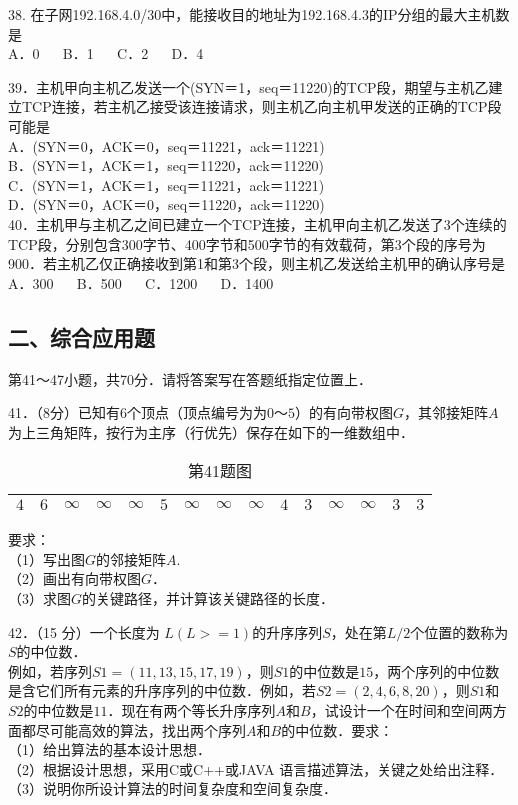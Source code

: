 38. 在子网192.168.4.0/30中，能接收目的地址为192.168.4.3的IP分组的最大主机数是 \\
A．0 $\quad$ B．1 $\quad$ C．2 $\quad$ D．4

39．主机甲向主机乙发送一个(SYN＝1，seq＝11220)的TCP段，期望与主机乙建立TCP连接，若主机乙接受该连接请求，则主机乙向主机甲发送的正确的TCP段可能是 \\
A．(SYN＝0，ACK＝0，seq＝11221，ack＝11221) \\
B．(SYN＝1，ACK＝1，seq＝11220，ack＝11220) \\
C．(SYN＝1，ACK＝1，seq＝11221，ack＝11221) \\
D．(SYN＝0，ACK＝0，seq＝11220，ack＝11220) \\

40．主机甲与主机乙之间已建立一个TCP连接，主机甲向主机乙发送了3个连续的TCP段，分别包含300字节、400字节和500字节的有效载荷，第3个段的序号为900．若主机乙仅正确接收到第1和第3个段，则主机乙发送给主机甲的确认序号是 \\
A．300 $\quad$ B．500 $\quad$ C．1200 $\quad$ D．1400


\subsection{二、综合应用题}
第41～47小题，共70分．请将答案写在答题纸指定位置上．

41．（8分）已知有$6$个顶点（顶点编号为为$0$～$5$）的有向带权图$G$，其邻接矩阵$A$为上三角矩阵，按行为主序（行优先）保存在如下的一维数组中．
\begin{table}[ht]
\centering
\caption{第41题图}\label{Na11_tab1}
\begin{tabular}{|c|c|c|c|c|c|c|c|c|c|c|c|c|c|c|}
\hline
$4$ & $6$ & $\infty$ & $\infty$ & $\infty$ & $5$ & $\infty$ & $\infty$ & $\infty$ & $4$ & $3$ & $\infty$ & $\infty$ & $3$ & $3$ \\
\hline
\end{tabular}
\end{table}
要求：  \\
（1）写出图$G$的邻接矩阵$A$.  \\
（2）画出有向带权图$G$．  \\
（3）求图$G$的关键路径，并计算该关键路径的长度．

42．（15 分）一个长度为 $L(L>=1)$的升序序列$S$，处在第$L/2$个位置的数称为$S$的中位数． \\
例如，若序列$S1=(11,13,15,17,19)$，则$S1$的中位数是$15$，两个序列的中位数是含它们所有元素的升序序列的中位数．例如，若$S2=(2,4,6,8,20)$，则$S1$和$S2$的中位数是$11$．现在有两个等长升序序列$A$和$B$，试设计一个在时间和空间两方面都尽可能高效的算法，找出两个序列$A$和$B$的中位数．要求： \\
（1）给出算法的基本设计思想． \\
（2）根据设计思想，采用C或C++或JAVA 语言描述算法，关键之处给出注释． \\
（3）说明你所设计算法的时间复杂度和空间复杂度． \\

